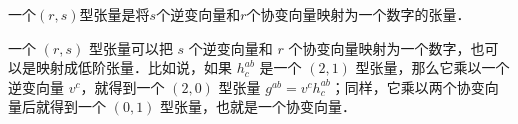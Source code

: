 
\begin{definition}{}
一个$(r, s)$型张量是将$s$个逆变向量和$r$个协变向量映射为一个数字的张量．
\end{definition}

一个 $(r, s)$ 型张量可以把 $s$ 个逆变向量和 $r$ 个协变向量映射为一个数字，也可以是映射成低阶张量．比如说，如果 $h^{ab}_c$ 是一个 $(2, 1)$ 型张量，那么它乘以一个逆变向量 $v^c$，就得到一个 $(2, 0)$ 型张量 $g^{ab}=v^ch^{ab}_c$；同样，它乘以两个协变向量后就得到一个 $(0, 1)$ 型张量，也就是一个协变向量．













